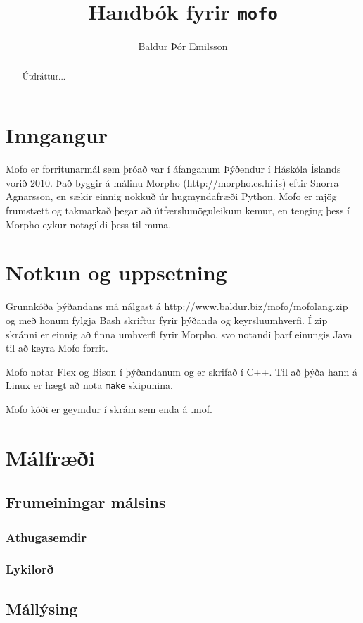 \documentclass[12pt,a4paper]{article}
\begin{document}
\sloppy
\title{Handbók fyrir {\bf{\tt mofo}}}
\author{Baldur Þór Emilsson}
\maketitle

\begin{abstract}
Útdráttur...
\end{abstract}

\tableofcontents

\section{Inngangur}
Mofo er forritunarmál sem þróað var í áfanganum Þýðendur í Háskóla Íslands vorið 2010.
Það byggir á málinu Morpho (http://morpho.cs.hi.is) eftir Snorra Agnarsson, en sækir einnig nokkuð
úr hugmyndafræði Python.
Mofo er mjög frumstætt og takmarkað þegar að útfærslumöguleikum kemur, en tenging þess í Morpho eykur notagildi þess til muna.
\section{Notkun og uppsetning}
Grunnkóða þýðandans má nálgast á http://www.baldur.biz/mofo/mofolang.zip og með honum fylgja Bash skriftur fyrir
þýðanda og keyrsluumhverfi. Í zip skránni er einnig að finna umhverfi fyrir Morpho, svo notandi þarf einungis Java
til að keyra Mofo forrit.

Mofo notar Flex og Bison í þýðandanum og er skrifað í C++. Til að þýða hann á Linux er hægt að nota {\tt make} skipunina.

Mofo kóði er geymdur í skrám sem enda á .mof. 
\section{Málfræði}
\subsection{Frumeiningar málsins}
\subsubsection{Athugasemdir}
\subsubsection{Lykilorð}
\subsection{Mállýsing}
\end{document}

